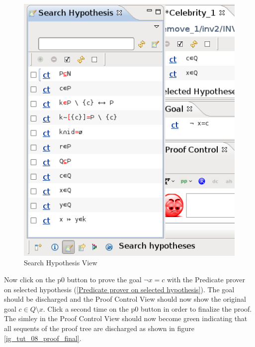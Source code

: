\begin{figure}[!h]
\begin{center}
	\includegraphics{img/tutorial/tut_08_search_hypothesis.png}
	\caption{Search Hypothesis View}
	\label{fig_tut_08_search_hypothesis}
\end{center}
\end{figure}

Now click on the \textsf{p0} button to prove the goal $\lnot x = c$ with the \textsf{Predicate prover on selected hypothesis} (\ref{Predicate prover on selected hypothesis}). The goal should be discharged and the \textsf{Proof Control View} should now show the original goal $c \in Q \setminus {x}$. Click a second time on the \textsf{p0} button in order to finalize the proof. The simley in the \textsf{Proof Control View} should now become green indicating that all sequents of the proof tree are discharged as shown in figure \ref{ig_tut_08_proof_final}.

